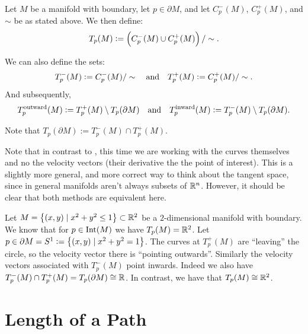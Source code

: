 \documentclass[11pt,a4paper]{article}
\begin{document}
\begin{definition}
  Let $M$ be a manifold with boundary,
  let $p \in \partial M$,
  and let $C^{-}_p(M)$, $C^{+}_p(M)$, and $\sim$ be as stated above.
  We then define:
  \[
    T_p(M) := \del{C^{-}_p(M) \cup C^{+}_p(M)} / \sim.
  \]
\end{definition}
\begin{remark}
  \label{rmk:out-in}
  We can also define the sets:
  \[
    T^{-}_p(M) := C^{-}_p(M) / \sim \quad \text{and} \quad
    T^{+}_p(M) := C^{+}_p(M) / \sim.
  \]
  And subsequently,
  \[
    T_p^{\text{outward}}(M) := T^{+}_p(M) \setminus T_p(\partial M) \quad \text{and} \quad
    T_p^{\text{inward}}(M) := T^{-}_p(M) \setminus T_p(\partial M).
  \]
\end{remark}

\begin{remark}
  Note that $T_p(\partial M) := T^{-}_p(M) \cap T^{+}_p(M)$.
\end{remark}

\begin{remark}
  Note that in contrast to ,
  this time we are working with the curves themselves and no the velocity
  vectors (their derivative the the point of interest).
  This is a slightly more general, and more correct way to think
  about the tangent space, since in general manifolds aren't always
  subsets of $\mathbb{R}^n$.
  However, it should be clear that both methods are equivalent here.
\end{remark}

\begin{example}
  Let $M = \left\{(x,y) \mid x^2 + y^2 \le 1\right\} \subset \mathbb{R}^2$
  be a $2$-dimensional manifold with boundary.
  We know that for $p \in \operatorname{Int}(M)$ we have $T_p(M) = \mathbb{R}^2$.
  Let $p \in \partial M = S^1 := \left\{(x,y) \mid x^2 + y^2 = 1\right\}$.
  The curves at $T^{+}_p(M)$ are ``leaving'' the circle,
  so the velocity vector there is ``pointing outwards''.
  Similarly the velocity vectors associated with $T^{-}_p(M)$
  point inwards.
  Indeed we also have $T^{-}_p(M) \cap T^{+}_p(M) = T_p(\partial M) \cong \mathbb{R}$.
  In contrast, we have that $T_p(M) \cong \mathbb{R}^2$.
\end{example}

\newpage

\section{Length of a Path}
\end{document}
